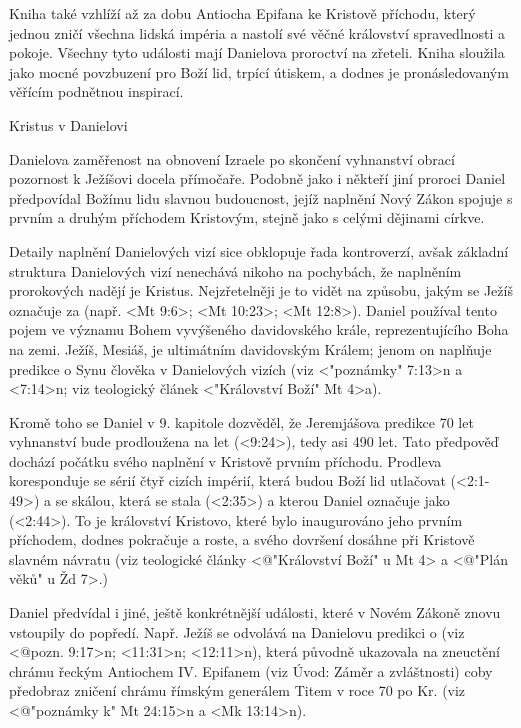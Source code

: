 Kniha také vzhlíží až za dobu Antiocha Epifana ke Kristově příchodu, který jednou zničí všechna lidská impéria a nastolí své věčné království spravedlnosti a pokoje.
Všechny tyto události mají Danielova proroctví na zřeteli.
Kniha sloužila jako mocné povzbuzení pro Boží lid, trpící útiskem, a dodnes je pronásledovaným věřícím podnětnou inspirací. 

Kristus v Danielovi

Danielova zaměřenost na obnovení Izraele po skončení vyhnanství obrací pozornost k Ježíšovi docela přímočaře.
Podobně jako i někteří jiní proroci Daniel předpovídal Božímu lidu slavnou budoucnost, jejíž naplnění Nový Zákon 
spojuje s prvním a druhým příchodem Kristovým, stejně jako s celými dějinami církve.

Detaily naplnění Danielových vizí sice obklopuje řada kontroverzí, avšak základní struktura Danielových vizí nenechává nikoho na pochybách, že naplněním prorokových nadějí je Kristus.
Nejzřetelněji je to vidět na způsobu, jakým se Ježíš označuje za  (např. <Mt 9:6>; <Mt 10:23>; <Mt 12:8>).
Daniel používal tento pojem ve významu Bohem vyvýšeného davidovského krále, reprezentujícího Boha na zemi.
Ježíš, Mesiáš, je ultimátním davidovským Králem; jenom on naplňuje predikce o Synu člověka v Danielových vizích (viz <"poznámky" 7:13>n a <7:14>n; viz teologický článek 
<"Království Boží"  Mt 4>a). 

Kromě toho se Daniel v 9. kapitole dozvěděl, že Jeremjášova predikce 70 let vyhnanství bude prodloužena 
na  let (<9:24>), tedy asi 490 let.
Tato předpověď dochází počátku svého naplnění v Kristově prvním příchodu. Prodleva koresponduje se sérií čtyř cizích impérií, která budou Boží lid utlačovat (<2:1-49>) a se skálou, která se stala  (<2:35>) a kterou Daniel označuje jako  (<2:44>). 
To je království Kristovo, které bylo inaugurováno jeho prvním příchodem, dodnes pokračuje a roste, a svého dovršení dosáhne při Kristově slavném návratu (viz teologické články <@"Království Boží" u Mt 4> a <@"Plán věků" u Žd 7>.)

Daniel předvídal i jiné, ještě konkrétnější události, které v Novém Zákoně znovu vstoupily do popředí.
Např. Ježíš  se odvolává na Danielovu predikci o  (viz <@pozn. 9:17>n; <11:31>n; <12:11>n),
která původně ukazovala na zneuctění chrámu řeckým Antiochem IV. Epifanem (viz Úvod: Záměr a zvláštnosti) coby předobraz zničení chrámu  římským generálem Titem v roce 70 po Kr. (viz <@"poznámky k" Mt 24:15>n a <Mk 13:14>n).


